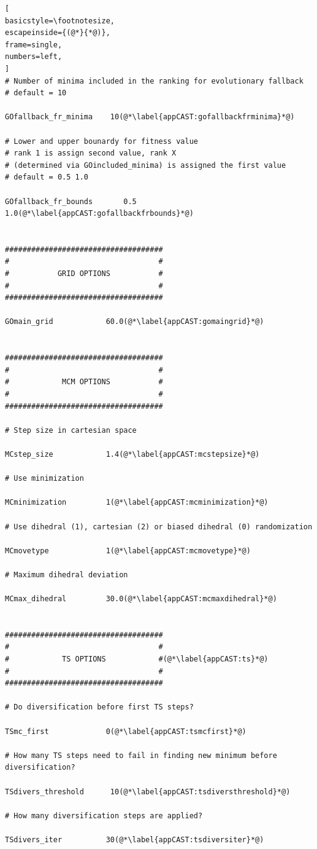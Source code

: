 \documentclass[a4paper,11pt]{scrartcl}
\begin{document}
\begin{lstlisting}[
basicstyle=\footnotesize,
escapeinside={(@*}{*@)},
frame=single,
numbers=left,
]
# Number of minima included in the ranking for evolutionary fallback
# default = 10

GOfallback_fr_minima    10(@*\label{appCAST:gofallbackfrminima}*@)

# Lower and upper bounardy for fitness value
# rank 1 is assign second value, rank X 
# (determined via GOincluded_minima) is assigned the first value
# default = 0.5 1.0

GOfallback_fr_bounds       0.5 1.0(@*\label{appCAST:gofallbackfrbounds}*@)


####################################
#                                  #
#           GRID OPTIONS           #
#                                  #
####################################

GOmain_grid            60.0(@*\label{appCAST:gomaingrid}*@)


####################################
#                                  #
#            MCM OPTIONS           #
#                                  #
####################################

# Step size in cartesian space 

MCstep_size            1.4(@*\label{appCAST:mcstepsize}*@)

# Use minimization

MCminimization         1(@*\label{appCAST:mcminimization}*@)

# Use dihedral (1), cartesian (2) or biased dihedral (0) randomization

MCmovetype             1(@*\label{appCAST:mcmovetype}*@)

# Maximum dihedral deviation

MCmax_dihedral         30.0(@*\label{appCAST:mcmaxdihedral}*@)


####################################
#                                  #
#            TS OPTIONS            #(@*\label{appCAST:ts}*@)
#                                  #
####################################

# Do diversification before first TS steps?

TSmc_first             0(@*\label{appCAST:tsmcfirst}*@)

# How many TS steps need to fail in finding new minimum before diversification?

TSdivers_threshold      10(@*\label{appCAST:tsdiversthreshold}*@)

# How many diversification steps are applied?

TSdivers_iter          30(@*\label{appCAST:tsdiversiter}*@)


\end{lstlisting}
\end{document}
